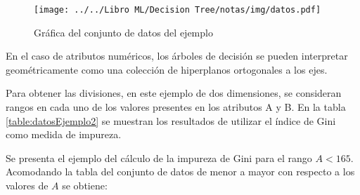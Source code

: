 \documentclass[
10pt, %
a4paper, %
]{article}
\begin{document}
\begin{figure}[H]
	\centering
	\texttt{[image: ../../Libro ML/Decision Tree/notas/img/datos.pdf]}
	\caption{Gráfica del conjunto de datos del ejemplo}
	\label{fig:datosEjemplo}
\end{figure}

En el caso de atributos numéricos, los árboles de decisión se pueden interpretar geométricamente como una colección de hiperplanos ortogonales a los ejes. 

Para obtener las divisiones, en este ejemplo de dos dimensiones, se consideran rangos en cada uno de los valores presentes en los atributos A y B. En la  
tabla \ref{table:datosEjemplo2} se muestran los resultados de utilizar el índice de Gini como medida de impureza.

Se presenta el ejemplo del cálculo de la impureza de Gini para el rango $A<165$. Acomodando la tabla del conjunto de datos de menor a mayor con respecto a los 
valores de $A$ se obtiene:
\end{document}
